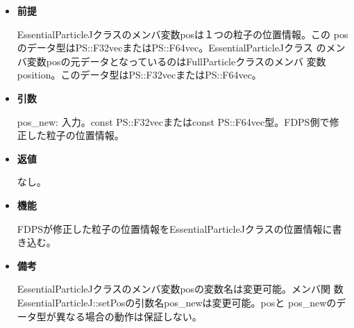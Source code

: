 \begin{itemize}

\item {\bf 前提}
  
  EssentialParticleJクラスのメンバ変数posは１つの粒子の位置情報。この
  posのデータ型はPS::F32vecまたはPS::F64vec。EssentialParticleJクラス
  のメンバ変数posの元データとなっているのはFullParticleクラスのメンバ
  変数position。このデータ型はPS::F32vecまたはPS::F64vec。

\item {\bf 引数}

  pos\_new: 入力。const PS::F32vecまたはconst PS::F64vec型。FDPS側で修
  正した粒子の位置情報。

\item {\bf 返値}

  なし。
  
\item {\bf 機能}

  FDPSが修正した粒子の位置情報をEssentialParticleJクラスの位置情報に書き込む。

\item {\bf 備考}

  EssentialParticleJクラスのメンバ変数posの変数名は変更可能。メンバ関
  数EssentialParticleJ::setPosの引数名pos\_newは変更可能。posと
  pos\_newのデータ型が異なる場合の動作は保証しない。

\end{itemize}
